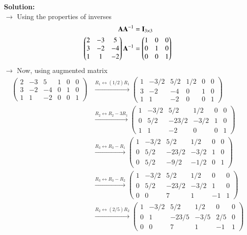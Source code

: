 \documentclass[journal]{IEEEtran}
\begin{document}
\textbf{Solution:}\\
$\rightarrow$ Using the properties of inverses
\begin{align}
    \mathbf{A} \mathbf{A}^{-1} &= \mathbf{I}_{3\times3} \\
    \begin{pmatrix}2&-3&5\\3&-2&-4\\1&1&-2\end{pmatrix}\mathbf{A}^{-1} &= \begin{pmatrix}1&0&0\\0&1&0\\0&0&1\end{pmatrix}
\end{align}
$\rightarrow$ Now, using augmented matrix
\begin{align}
\left(\begin{array}{ccc|ccc} 2&-3&5&1&0&0\\3&-2&-4&0&1&0\\1&1&-2&0&0&1 \end{array}\right)
&\xrightarrow{R_1 \leftrightarrow (1/2)R_1} \left(\begin{array}{ccc|ccc} 1&-3/2&5/2&1/2&0&0\\3&-2&-4&0&1&0\\1&1&-2&0&0&1 \end{array}\right) \\
&\xrightarrow{R_2 \leftrightarrow R_2 - 3R_1} \left(\begin{array}{ccc|ccc} 1&-3/2&5/2&1/2&0&0\\0&5/2&-23/2&-3/2&1&0\\1&1&-2&0&0&1 \end{array}\right) \\
&\xrightarrow{R_3 \leftrightarrow R_3 - R_1} \left(\begin{array}{ccc|ccc} 1&-3/2&5/2&1/2&0&0\\0&5/2&-23/2&-3/2&1&0\\0&5/2&-9/2&-1/2&0&1 \end{array}\right) \\
&\xrightarrow{R_3 \leftrightarrow R_3 - R_2} \left(\begin{array}{ccc|ccc} 1&-3/2&5/2&1/2&0&0\\0&5/2&-23/2&-3/2&1&0\\0&0&7&1&-1&1 \end{array}\right) \\
&\xrightarrow{R_2 \leftrightarrow (2/5)R_2} \left(\begin{array}{ccc|ccc} 1&-3/2&5/2&1/2&0&0\\0&1&-23/5&-3/5&2/5&0\\0&0&7&1&-1&1 \end{array}\right) \\

\end{align}
\end{document}
